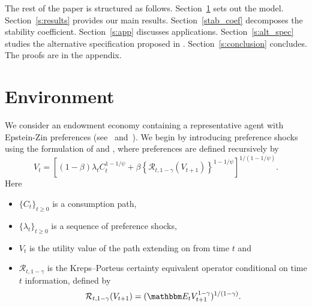 \documentclass[12pt, reqno]{amsart}
\renewcommand{\geq}{\geqslant}
\newcommand{\1}{\mathbbm 1}
\newcommand{\rR}{\mathcal R}
\newcommand{\EE}{\mathbbm E}
\theoremstyle{plain}
\theoremstyle{definition}
\begin{document}
The rest of the paper is structured as follows. Section~\ref{s:env} sets out
the model. Section~\ref{s:results} provides our main results.
Section~\ref{stab_coef} decomposes the stability coefficient.
Section~\ref{s:app} discusses applications. Section~\ref{s:alt_spec} studies
the alternative specification proposed in \cite{deGroot2018}.
Section~\ref{s:conclusion} concludes. The proofs are in the appendix.

\section{Environment}\label{s:env}

We consider an endowment economy containing a representative agent with
Epstein-Zin preferences (see~\cite{epstein1989risk}
and~\cite{weil1990nonexpected}). We begin by introducing preference shocks
using the formulation of \cite{Albuquerque2016} and
\cite{schorfheide2018identifying}, where preferences are defined recursively
by
%
\begin{equation}
    \label{eq:agg}
    V_t = \left[
            (1 - \beta) \lambda_t C_t^{1-1/\psi}
            + \beta \left\{ \rR_{t, 1-\gamma} \left(V_{t+1}
            \right) \right\}^{1-1/\psi}
          \right]^{1/(1-1/\psi)}.
\end{equation}
%
Here 
%
\begin{itemize}
    \item $\{ C_t \}_{t \geq 0}$ is a consumption path,
    \item $\{ \lambda_t \}_{t \geq 0}$ is a sequence of preference shocks,
    \item $V_t$ is the utility value of the path extending on from time $t$ and 
    \item $\rR_{t, 1-\gamma}$ is the Kreps--Porteus certainty equivalent operator
        conditional on time $t$ information, defined by
    \begin{equation}
        \label{eq:ce}
        \rR_{t, 1-\gamma}(V_{t+1})
        = ( \EE_t  V^{1-\gamma}_{t+1} )^{1/(1-\gamma)}.
    \end{equation}
\end{itemize}
\end{document}
